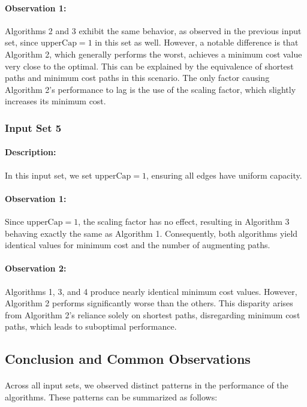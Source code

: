 \documentclass{article}
\begin{document}
\paragraph{Observation 1:}
Algorithms 2 and 3 exhibit the same behavior, as observed in the previous input set, since \( \text{upperCap} = 1 \) in this set as well. However, a notable difference is that Algorithm 2, which generally performs the worst, achieves a minimum cost value very close to the optimal. This can be explained by the equivalence of shortest paths and minimum cost paths in this scenario. The only factor causing Algorithm 2's performance to lag is the use of the scaling factor, which slightly increases its minimum cost.


\subsubsection{Input Set 5}
\paragraph{Description:}
In this input set, we set \( \text{upperCap} = 1 \), ensuring all edges have uniform capacity.

\paragraph{Observation 1:}
Since \( \text{upperCap} = 1 \), the scaling factor has no effect, resulting in Algorithm 3 behaving exactly the same as Algorithm 1. Consequently, both algorithms yield identical values for minimum cost and the number of augmenting paths.

\paragraph{Observation 2:}
Algorithms 1, 3, and 4 produce nearly identical minimum cost values. However, Algorithm 2 performs significantly worse than the others. This disparity arises from Algorithm 2's reliance solely on shortest paths, disregarding minimum cost paths, which leads to suboptimal performance.


\subsection{Conclusion and Common Observations}
\paragraph{}
Across all input sets, we observed distinct patterns in the performance of the algorithms. These patterns can be summarized as follows:
\end{document}
